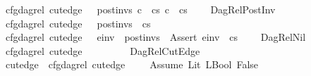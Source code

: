 \begin{isabellebody}
\ \ \ \ \ cfg{\isacharunderscore}{\kern0pt}dag{\isacharunderscore}{\kern0pt}rel\ cut{\isacharunderscore}{\kern0pt}edge\ {\isacharbrackleft}{\kern0pt}{\isacharbrackright}{\kern0pt}\ {\isacharbrackleft}{\kern0pt}{\isacharbrackright}{\kern0pt}\ post{\isacharunderscore}{\kern0pt}invs\ {\isacharparenleft}{\kern0pt}c\ {\isacharhash}{\kern0pt}\ cs{}{\isacharparenright}{\kern0pt}\ {\isacharparenleft}{\kern0pt}c\ {\isacharhash}{\kern0pt}\ cs{}{\isacharparenright}{\kern0pt}{\isachardoublequoteclose}\isanewline
\ \ \ {\isacharbar}{\kern0pt}\ DagRel{\isacharunderscore}{\kern0pt}PostInv{\isacharcolon}{\kern0pt}\isanewline
\ \ \ \ \ {\isachardoublequoteopen}{\isasymlbrakk}cfg{\isacharunderscore}{\kern0pt}dag{\isacharunderscore}{\kern0pt}rel\ cut{\isacharunderscore}{\kern0pt}edge\ {\isacharbrackleft}{\kern0pt}{\isacharbrackright}{\kern0pt}\ {\isacharbrackleft}{\kern0pt}{\isacharbrackright}{\kern0pt}\ post{\isacharunderscore}{\kern0pt}invs\ {\isacharbrackleft}{\kern0pt}{\isacharbrackright}{\kern0pt}\ cs{}{\isasymrbrakk}\ {\isasymLongrightarrow}\isanewline
\ \ \ \ \ cfg{\isacharunderscore}{\kern0pt}dag{\isacharunderscore}{\kern0pt}rel\ cut{\isacharunderscore}{\kern0pt}edge\ {\isacharbrackleft}{\kern0pt}{\isacharbrackright}{\kern0pt}\ {\isacharbrackleft}{\kern0pt}{\isacharbrackright}{\kern0pt}\ {\isacharparenleft}{\kern0pt}e{\isacharunderscore}{\kern0pt}inv\ {\isacharhash}{\kern0pt}\ post{\isacharunderscore}{\kern0pt}invs{\isacharparenright}{\kern0pt}\ {\isacharbrackleft}{\kern0pt}{\isacharbrackright}{\kern0pt}\ {\isacharparenleft}{\kern0pt}Assert\ e{\isacharunderscore}{\kern0pt}inv\ {\isacharhash}{\kern0pt}\ cs{}{\isacharparenright}{\kern0pt}{\isachardoublequoteclose}\isanewline
\ \ \ {\isacharbar}{\kern0pt}\ DagRel{\isacharunderscore}{\kern0pt}Nil{\isacharcolon}{\kern0pt}\isanewline
\ \ \ \ \ {\isachardoublequoteopen}cfg{\isacharunderscore}{\kern0pt}dag{\isacharunderscore}{\kern0pt}rel\ cut{\isacharunderscore}{\kern0pt}edge\ {\isacharbrackleft}{\kern0pt}{\isacharbrackright}{\kern0pt}\ {\isacharbrackleft}{\kern0pt}{\isacharbrackright}{\kern0pt}\ {\isacharbrackleft}{\kern0pt}{\isacharbrackright}{\kern0pt}\ {\isacharbrackleft}{\kern0pt}{\isacharbrackright}{\kern0pt}\ {\isacharbrackleft}{\kern0pt}{\isacharbrackright}{\kern0pt}{\isachardoublequoteclose}\isanewline
\ \ \ {\isacharbar}{\kern0pt}\ DagRel{\isacharunderscore}{\kern0pt}CutEdge{\isacharcolon}{\kern0pt}\isanewline
\ \ \ \ \ {\isachardoublequoteopen}cut{\isacharunderscore}{\kern0pt}edge\ {\isasymLongrightarrow}\ cfg{\isacharunderscore}{\kern0pt}dag{\isacharunderscore}{\kern0pt}rel\ cut{\isacharunderscore}{\kern0pt}edge\ {\isacharbrackleft}{\kern0pt}{\isacharbrackright}{\kern0pt}\ {\isacharbrackleft}{\kern0pt}{\isacharbrackright}{\kern0pt}\ {\isacharbrackleft}{\kern0pt}{\isacharbrackright}{\kern0pt}\ {\isacharbrackleft}{\kern0pt}{\isacharbrackright}{\kern0pt}\ {\isacharbrackleft}{\kern0pt}Assume\ {\isacharparenleft}{\kern0pt}Lit\ {\isacharparenleft}{\kern0pt}LBool\ False{\isacharparenright}{\kern0pt}{\isacharparenright}{\kern0pt}{\isacharbrackright}{\kern0pt}{\isachardoublequoteclose}\isanewline

\end{isabellebody}
